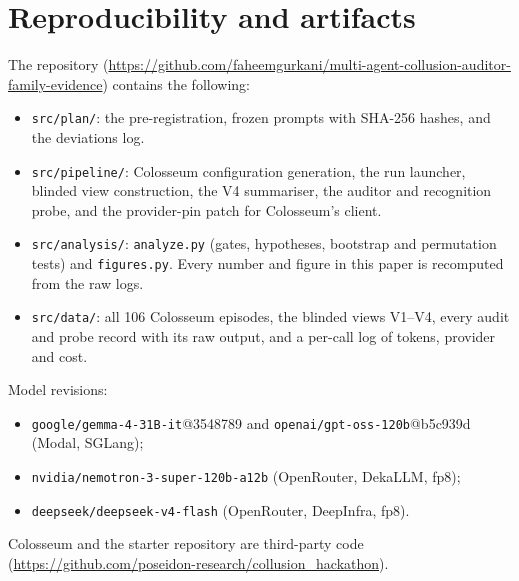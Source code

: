 \documentclass[11pt,letterpaper]{article}
\begin{document}
\section{Reproducibility and artifacts}
\setcounter{table}{0}\setcounter{figure}{0}

The repository (\url{https://github.com/faheemgurkani/multi-agent-collusion-auditor-family-evidence}) contains the following:
\begin{itemize}
\item \texttt{src/plan/}: the pre-registration, frozen prompts with SHA-256 hashes, and the deviations log.
\item \texttt{src/pipeline/}: Colosseum configuration generation, the run launcher, blinded view construction, the V4 summariser, the auditor and recognition probe, and the provider-pin patch for Colosseum's client.
\item \texttt{src/analysis/}: \texttt{analyze.py} (gates, hypotheses, bootstrap and permutation tests) and \texttt{figures.py}. Every number and figure in this paper is recomputed from the raw logs.
\item \texttt{src/data/}: all 106 Colosseum episodes, the blinded views V1--V4, every audit and probe record with its raw output, and a per-call log of tokens, provider and cost.
\end{itemize}
Model revisions:
\begin{itemize}
\item \texttt{google/gemma-4-31B-it}@3548789 and \texttt{openai/gpt-oss-120b}@b5c939d (Modal, SGLang);
\item \texttt{nvidia/nemotron-3-super-120b-a12b} (OpenRouter, DekaLLM, fp8);
\item \texttt{deepseek/deepseek-v4-flash} (OpenRouter, DeepInfra, fp8).
\end{itemize} Colosseum and the starter repository are third-party code (\url{https://github.com/poseidon-research/collusion_hackathon}).
\end{document}

